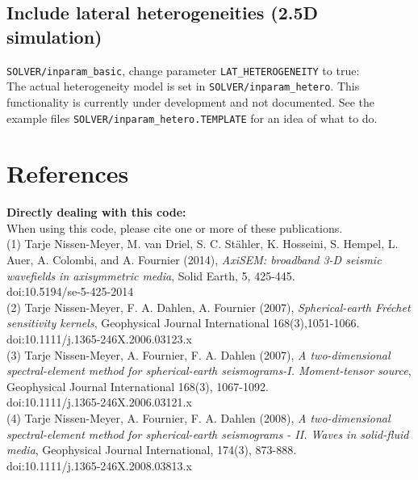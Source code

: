 \documentclass{article}
\begin{document}
\subsection{Include lateral heterogeneities (2.5D simulation)}
\verb|SOLVER/inparam_basic|, change parameter \verb|LAT_HETEROGENEITY| to true:\\
The actual heterogeneity model is set in \verb|SOLVER/inparam_hetero|.
This functionality is currently under development and not documented. See the example
files \verb|SOLVER/inparam_hetero.TEMPLATE| for an idea of what to do.


\newpage
\section{References}

\noindent \textbf{Directly dealing with this code:}\vspace*{0.2cm}\\
When using this code, please cite one or more of these publications. \vspace*{0.2cm}\\


(1) Tarje Nissen-Meyer, M. van Driel, S. C. Stähler, K. Hosseini, S. Hempel, L. Auer,
A. Colombi, and A. Fournier (2014), \textit{AxiSEM: broadband 3-D seismic wavefields
in axisymmetric media},  Solid Earth, 5, 425-445. \\
doi:10.5194/se-5-425-2014\\

(2) Tarje Nissen-Meyer, F. A. Dahlen, A. Fournier (2007),
\textit{Spherical-earth Fr\'{e}chet sensitivity kernels},
Geophysical Journal International 168(3),1051-1066. \\
doi:10.1111/j.1365-246X.2006.03123.x                \\

(3) Tarje Nissen-Meyer, A. Fournier, F. A. Dahlen (2007),
\textit{A two-dimensional spectral-element method for
spherical-earth seismograms-I. Moment-tensor source},
Geophysical Journal International 168(3), 1067-1092. \\
doi:10.1111/j.1365-246X.2006.03121.x                 \\

(4) Tarje Nissen-Meyer, A. Fournier, F. A. Dahlen (2008),
\textit{A two-dimensional spectral-element method for
spherical-earth seismograms - II. Waves in solid-fluid media},
Geophysical Journal International, 174(3), 873-888.\\
doi:10.1111/j.1365-246X.2008.03813.x\\
\end{document}
